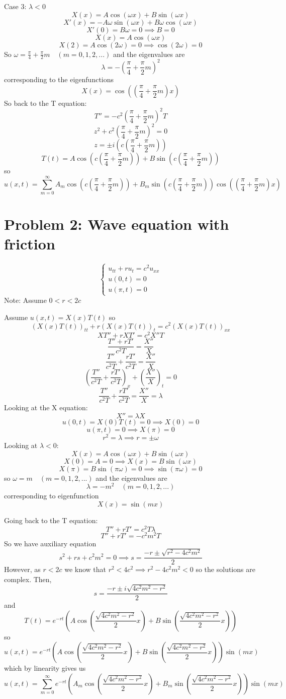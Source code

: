 \documentclass[12pt]{article}
\begin{document}
Case 3: $\lambda < 0$
\[X(x) = A\cos(\omega x) + B\sin(\omega x)\]
\[X'(x) = -A\omega\sin(\omega x) + B\omega \cos(\omega x)\]
\[X'(0) = B\omega = 0\implies B = 0\]
\[X(x) = A\cos(\omega x)\]
\[X(2)= A\cos(2\omega) = 0 \implies \cos(2\omega) = 0\]
So $\omega = \frac{\pi}{4} + \frac{\pi}{2}m \quad (m = 0, 1, 2,...)$ and the eigenvalues are 
\[\lambda = -(\frac{\pi}{4} + \frac{\pi}{2}m)^2\]
corresponding to the eigenfunctions
\[X(x) = \cos((\frac{\pi}{4} +\frac{\pi}{2}m)x)\]
So back to the T equation:
\[ T'' = -c^2(\frac{\pi}{4} + \frac{\pi}{2}m)^2T\] 
\[z^2 + c^2(\frac{\pi}{4} + \frac{\pi}{2}m)^2 = 0\]
\[z = \pm i(c(\frac{\pi}{4} + \frac{\pi}{2}m))\]
\[T(t) = A\cos(c(\frac{\pi}{4} + \frac{\pi}{2}m)) + B\sin(c(\frac{\pi}{4} + \frac{\pi}{2}m))\]
so 
\[\boxed{u(x, t) =\sum_{m=0}^\infty A_m\cos(c(\frac{\pi}{4} + \frac{\pi}{2}m)) + B_m\sin(c(\frac{\pi}{4} + \frac{\pi}{2}m))\cos((\frac{\pi}{4} +\frac{\pi}{2}m)x) }\]
\color{black}
\pagebreak
\section*{Problem 2: Wave equation with friction} 
\[\begin{cases}
    u_{tt} + ru_t = c^2 u_{xx}\\
    u(0, t) = 0\\
    u(\pi, t) = 0
\end{cases}\]
Note: Assume $0 < r < 2c$

\color{blue}
Assume $u(x, t) = X(x)T(t)$ so 
\[(X(x)T(t))_{tt} + r(X(x)T(t))_t = c^2(X(x)T(t))_{xx}\]
\[XT'' + rXT' = c^2X''T\]
\[\frac{T'' + rT'}{c^2T} = \frac{X''}{X}\]
\[\frac{T''}{c^2T} + \frac{rT'}{c^2T} = \frac{X''}{X}\]
\[\left(\frac{T''}{c^2T} + \frac{rT'}{c^2T}\right)_x + \left(\frac{X''}{X}\right)_t = 0\]
\[\frac{T''}{c^2T} + \frac{rT'}{c^2T} = \frac{X''}{X} = \lambda\]
Looking at the X equation:
\[X'' = \lambda X\]
\[u(0, t) = X(0)T(t) = 0 \implies X(0) = 0\]
\[u(\pi, t) = 0 \implies X(\pi) = 0\]
\[r^2 = \lambda \implies r = \pm \omega\]
Looking at $\lambda < 0$:
\[X(x) = A\cos(\omega x) + B\sin(\omega x)\]
\[X(0) = A = 0 \implies X(x) = B\sin(\omega x)\]
\[X(\pi) = B \sin(\pi \omega) = 0 \implies \sin(\pi \omega) = 0\]
so $\omega = m \quad (m = 0, 1, 2, ...)$
and the eigenvalues are 
\[\lambda = -m^2 \quad (m = 0, 1, 2, ...)\]
corresponding to eigenfunction 
\[X(x) = \sin(mx)\]

Going back to the T equation:
\[T'' + rT' = c^2T\lambda\]
\[T'' + rT' = -c^2m^2T\]
So we have auxiliary equation 
\[s^2 + rs + c^2m^2 = 0 \implies s = \frac{-r \pm \sqrt{r^2 - 4c^2m^2}}{2}\]
However, as $r < 2c$ we know that $r^2 < 4c^2 \implies r^2 - 4c^2m^2 < 0$ so the solutions are complex. Then,
\[ s = \frac{-r \pm i\sqrt{4c^2m^2 - r^2}}{2}\]
and 
\[T(t) = e^{-rt}\left(A\cos\left(\frac{\sqrt{4c^2m^2 - r^2}}{2}x\right) + B\sin\left(\frac{\sqrt{4c^2m^2 - r^2}}{2}x\right)\right)\]
so 
\[u(x, t) = e^{-rt}\left(A\cos\left(\frac{\sqrt{4c^2m^2 - r^2}}{2}x\right) + B\sin\left(\frac{\sqrt{4c^2m^2 - r^2}}{2}x\right)\right)\sin(mx)\]
which by linearity gives us 
\[\boxed{u(x, t) = \sum_{m = 0}^\infty e^{-rt}\left(A_m\cos\left(\frac{\sqrt{4c^2m^2 - r^2}}{2}x\right) + B_m\sin\left(\frac{\sqrt{4c^2m^2 - r^2}}{2}x\right)\right)\sin(mx)}\]
\color{black}
\pagebreak
\end{document}
